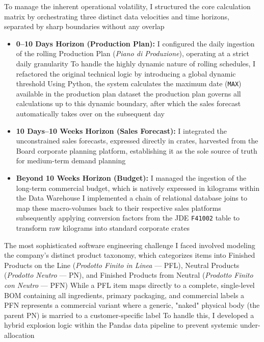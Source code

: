 To manage the inherent operational volatility, I structured the core calculation matrix by orchestrating three distinct data velocities and time horizons, separated by sharp boundaries without any overlap %
\begin{itemize}
    \item \textbf{0–10 Days Horizon (Production Plan):} I configured the daily ingestion of the rolling Production Plan (\textit{Piano di Produzione}), operating at a strict daily granularity %
    To handle the highly dynamic nature of rolling schedules, I refactored the original technical logic by introducing a global dynamic threshold %
    Using Python, the system calculates the maximum date (\texttt{MAX}) available in the production plan dataset %
    the production plan governs all calculations up to this dynamic boundary, after which the sales forecast automatically takes over on the subsequent day %
    \item \textbf{10 Days–10 Weeks Horizon (Sales Forecast):} I integrated the unconstrained sales forecasts, expressed directly in crates, harvested from the Board corporate planning platform, establishing it as the sole source of truth for medium-term demand planning %
    \item \textbf{Beyond 10 Weeks Horizon (Budget):} I managed the ingestion of the long-term commercial budget, which is natively expressed in kilograms within the Data Warehouse %
    I implemented a chain of relational database joins to map these macro-volumes back to their respective sales platforms %
    subsequently applying conversion factors from the JDE \texttt{F41002} table to transform raw kilograms into standard corporate crates %
\end{itemize}

The most sophisticated software engineering challenge I faced involved modeling the company's distinct product taxonomy, which categorizes items into Finished Products on the Line (\textit{Prodotto Finito in Linea} — PFL), Neutral Products (\textit{Prodotto Neutro} — PN), and Finished Products from Neutral (\textit{Prodotto Finito con Neutro} — PFN) %
While a PFL item maps directly to a complete, single-level BOM containing all ingredients, primary packaging, and commercial labels %
a PFN represents a commercial variant where a generic, "naked" physical body (the parent PN) is married to a customer-specific label %
To handle this, I developed a hybrid explosion logic within the Pandas data pipeline to prevent systemic under-allocation %

